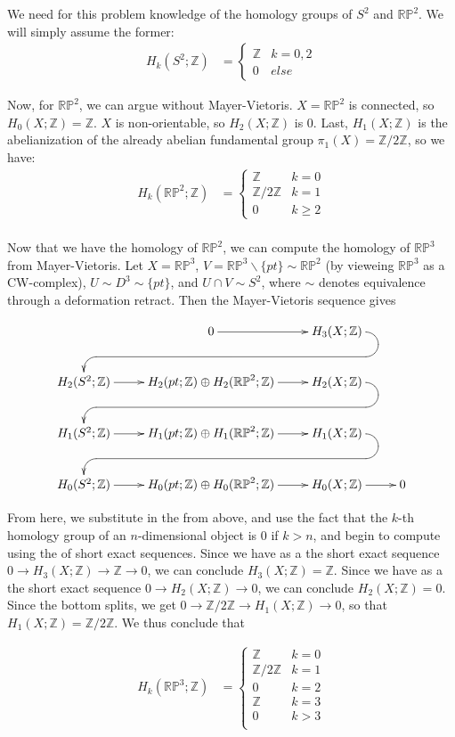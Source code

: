 \documentclass[12pt]{article}
\newcommand{\mb}{\mathbb}
\newcommand{\ra}{\rightarrow}
\newcommand{\Z}{\mb{Z}}
\newcommand{\<}{\langle}
\renewcommand{\>}{\rangle}
\begin{document}
We need for this problem knowledge of the homology groups of $S^2$ and $\mb{RP}^2$.  We will simply assume the former:
\begin{align*}
H_k(S^2; \Z)&= 
\begin{cases}
\Z&k=0,2\\
0&else
\end{cases}
\end{align*}

Now, for $\mb{RP}^2$, we can argue without Mayer-Vietoris. $X=\mb{RP}^2$ is connected, so $H_0(X;\Z)=\Z$.  $X$ is non-orientable, so $H_2(X;\Z)$ is 0.  Last, $H_1(X;\Z)$ is the abelianization of the already abelian fundamental group $\pi_1(X)=\Z/2\Z$, so we have:
\begin{align*}
H_k(\mb{RP}^2; \Z)&=
\begin{cases}
\Z&k=0\\
\Z/2\Z&k=1\\
0&k\geq 2
\end{cases}\\
\end{align*}

Now that we have the homology of $\mb{RP}^2$, we can compute the 
homology of $\mb{RP}^3$ from Mayer-Vietoris.  Let $X=\mb{RP}^3$,
$V=\mb{RP}^3\backslash\{pt\}\sim\mb{RP}^2$ (by vieweing $\mb{RP}^3$ as a CW-complex), $U\sim D^3\sim\{pt\}$, and $U\cap V\sim S^2$, where $\sim$ denotes equivalence through a deformation retract.  Then the Mayer-Vietoris sequence gives

$$\xymatrix{
&0\ar[r]& H_3(X;\Z)\ar `r_l[ll] `l^d[dll] [dll]\\
H_2(S^2;\Z)\ar[r] &  H_2(pt;\Z)\oplus H_2(\mb{RP}^2;\Z)\ar[r] & H_2(X;\Z)\ar `r_l[ll] `l^d[dll] [dll]\\
H_1(S^2;\Z)\ar[r] & H_1(pt;\Z)\oplus H_1(\mb{RP}^2;\Z)\ar[r] & H_1(X;\Z)\ar `r_l[ll] `l^d[dll] [dll]\\
H_0(S^2;\Z) \ar[r] &  H_0(pt;\Z)\oplus H_0(\mb{RP}^2;\Z)  \ar[r] & H_0(X;\Z)\ar[r] &0}$$

From here, we substitute in the  from above, and use the fact that the $k$-th homology group of an $n$-dimensional object is 0 if $k>n$, and begin to compute using the  of short exact sequences.  Since we have as a  the short exact sequence $0\ra H_3(X;\Z)\ra\Z\ra0$, we can conclude $H_3(X;\Z)=\Z$.  Since we have as a  the short exact sequence $0\ra H_2(X;\Z)\ra 0$, we can conclude $H_2(X;\Z)=0.$  Since the bottom  splits, we get $0\ra\Z/2\Z\ra H_1(X;\Z)\ra 0$, so that $H_1(X;\Z)=\Z/2\Z$.  We thus conclude that

\begin{align*}
H_k(\mb{RP}^3; \Z)&=
\begin{cases}
\Z&k=0\\
\Z/2\Z&k=1\\
0&k=2\\
\Z&k=3\\
0&k>3\\
\end{cases}
\end{align*}
\end{document}
